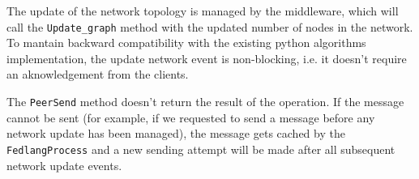 The update of the network topology is managed by the middleware, which will call the \texttt{Update\_graph} method with the updated number of nodes in the network.
To mantain backward compatibility with the existing python algorithms implementation, the update network event is non-blocking, i.e. it doesn't require an aknowledgement from the clients.

The \texttt{PeerSend} method doesn't return the result of the operation. If the message cannot be sent (for example, if we requested to send a message before any network update has been managed), the message gets cached by the \texttt{FedlangProcess} and a new sending attempt will be made after all subsequent network update events.
